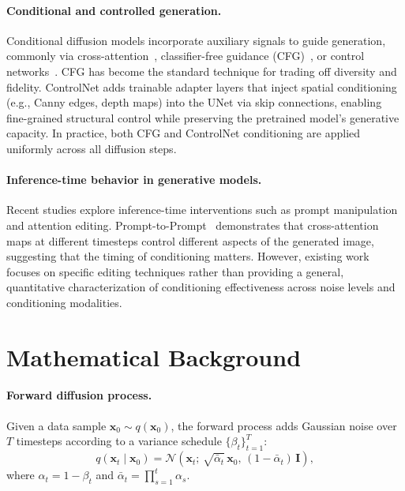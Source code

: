 \documentclass{article}
\begin{document}
\paragraph{Conditional and controlled generation.}
Conditional diffusion models incorporate auxiliary signals to guide generation, commonly via cross-attention~\citep{rombach2022high}, classifier-free guidance (CFG)~\citep{ho2022classifier}, or control networks~\citep{zhang2023adding}. CFG has become the standard technique for trading off diversity and fidelity. ControlNet adds trainable adapter layers that inject spatial conditioning (e.g., Canny edges, depth maps) into the UNet via skip connections, enabling fine-grained structural control while preserving the pretrained model's generative capacity. In practice, both CFG and ControlNet conditioning are applied uniformly across all diffusion steps.

\paragraph{Inference-time behavior in generative models.}
Recent studies explore inference-time interventions such as prompt manipulation and attention editing. Prompt-to-Prompt~\citep{hertz2022prompt} demonstrates that cross-attention maps at different timesteps control different aspects of the generated image, suggesting that the timing of conditioning matters. However, existing work focuses on specific editing techniques rather than providing a general, quantitative characterization of conditioning effectiveness across noise levels and conditioning modalities.

\section{Mathematical Background}
\label{sec:background}

\paragraph{Forward diffusion process.}
Given a data sample $\mathbf{x}_0 \sim q(\mathbf{x}_0)$, the forward process adds Gaussian noise over $T$ timesteps according to a variance schedule $\{\beta_t\}_{t=1}^{T}$:
\begin{equation}
    q(\mathbf{x}_t \mid \mathbf{x}_0) = \mathcal{N}\!\left(\mathbf{x}_t;\, \sqrt{\bar{\alpha}_t}\, \mathbf{x}_0,\, (1 - \bar{\alpha}_t)\, \mathbf{I}\right),
    \label{eq:forward}
\end{equation}
where $\alpha_t = 1 - \beta_t$ and $\bar{\alpha}_t = \prod_{s=1}^{t} \alpha_s$.
\end{document}

